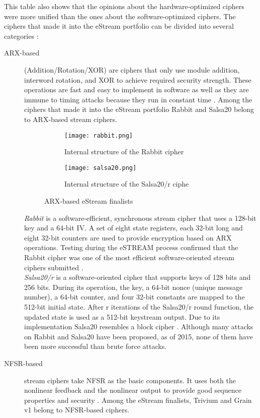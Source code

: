 This table also shows that the opinions about the hardware-optimized ciphers were more unified than the ones about the software-optimized ciphers.
The ciphers that made it into the eStream portfolio can be divided into several categories \cite{jiao2020stream}:
\begin{description}
	\item [ARX-based] (Addition/Rotation/XOR) are ciphers that only use module addition, interword rotation, and XOR to achieve required security strength. These operations are fast and easy to implement in software as well as they are immune to timing attacks because they run in constant time \cite{jiao2020stream}.
	Among the ciphers that made it into the eStream portfolio Rabbit and Salsa20 belong to ARX-based stream ciphers.
	\begin{figure}[h]
		
		\begin{subfigure}{0.5\textwidth}
			\texttt{[image: rabbit.png]} 
			\caption{Internal structure of the Rabbit cipher}
			\label{fig:rabbit}
		\end{subfigure}
		\begin{subfigure}{0.5\textwidth}
			\texttt{[image: salsa20.png]} 
			\caption{Internal structure of the Salsa20/r ciphe}
			\label{fig:salsa20}
		\end{subfigure}
		
		\caption{ARX-based eStream finalists}
		\label{fig:arx}
	\end{figure}
	
	\emph{Rabbit} is a software-efficient, synchronous stream cipher that uses a 128-bit key and a 64-bit IV. A set of eight state registers, each 32-bit long and eight 32-bit counters are used to provide encryption based on ARX operations. Testing during the eSTREAM process confirmed that the Rabbit cipher was one of the most efficient software-oriented stream ciphers submitted \cite{boesgaard2008rabbit}.\\
	\emph{Salsa20/r} is a software-oriented cipher that supports keys of 128 bits and 256 bits. During its operation, the key, a 64-bit nonce (unique message number), a 64-bit counter, and four 32-bit constants are mapped to the 512-bit initial state. After r iterations of the Salsa20/r round function, the updated state is used as a 512-bit keystream output. Due to its implementation Salsa20 resembles a block cipher \cite{bernstein2008salsa20}.
	Although many attacks on Rabbit and Salsa20 have been proposed, as of 2015, none of them have been more successful than brute force attacks. 
	\item [NFSR-based] stream ciphers take NFSR as the basic components. It uses both the nonlinear feedback and the nonlinear output to provide good sequence properties and security \cite{jiao2020stream}. 
	Among the eStream finalists, Trivium and Grain v1 belong to NFSR-based ciphers.
	

\end{description}
